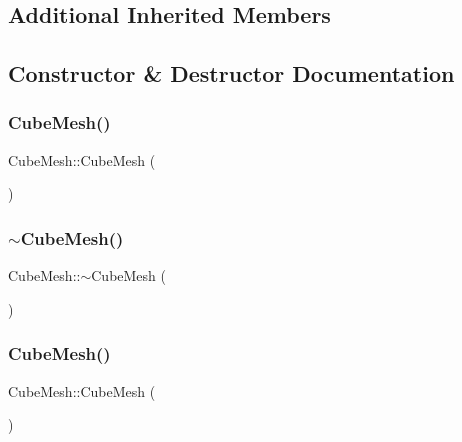 \subsection*{Additional Inherited Members}


\subsection{Constructor \& Destructor Documentation}
\mbox{\label{class_cube_mesh_aa096a7e837e8da5fb18b9e463ef9ea20}} 
\subsubsection{\texorpdfstring{CubeMesh()}{CubeMesh()}\hspace{0.1cm}{\footnotesize\ttfamily [1/2]}}
{\footnotesize\ttfamily Cube\+Mesh\+::\+Cube\+Mesh (\begin{DoxyParamCaption}{ }\end{DoxyParamCaption})}

\mbox{\label{class_cube_mesh_ab785a66ca3587acc32ff3c710dfeff47}} 
\subsubsection{\texorpdfstring{$\sim$CubeMesh()}{~CubeMesh()}\hspace{0.1cm}{\footnotesize\ttfamily [1/2]}}
{\footnotesize\ttfamily Cube\+Mesh\+::$\sim$\+Cube\+Mesh (\begin{DoxyParamCaption}{ }\end{DoxyParamCaption})}

\mbox{\label{class_cube_mesh_aa096a7e837e8da5fb18b9e463ef9ea20}} 
\subsubsection{\texorpdfstring{CubeMesh()}{CubeMesh()}\hspace{0.1cm}{\footnotesize\ttfamily [2/2]}}
{\footnotesize\ttfamily Cube\+Mesh\+::\+Cube\+Mesh (\begin{DoxyParamCaption}{ }\end{DoxyParamCaption})}

